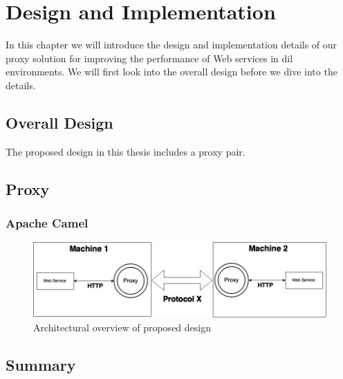 \chapter{Design and Implementation}

In this chapter we will introduce the design and implementation details of our
proxy solution for improving the performance of Web services in dil
environments. We will first look into the overall design before we dive into the
details.

\section{Overall Design}

The proposed design in this thesis includes a proxy pair.


\section{Proxy}

\subsection{Apache Camel}

\begin{figure}[h]
\includegraphics[scale=0.4]{images/architecture.png}
\caption{Architectural overview of proposed design}
\end{figure}


\section{Summary}
